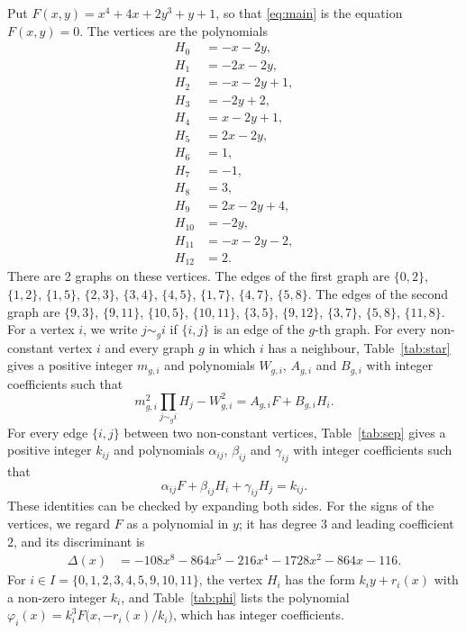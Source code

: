 \documentclass[11pt]{article}
\begin{document}
Put $F(x,y)=x^{4}+4x+2y^{3}+y+1$, so that \eqref{eq:main} is the equation $F(x,y)=0$. The vertices are the polynomials
\begin{align*}
H_{0}&=-x-2y,\\
H_{1}&=-2x-2y,\\
H_{2}&=-x-2y+1,\\
H_{3}&=-2y+2,\\
H_{4}&=x-2y+1,\\
H_{5}&=2x-2y,\\
H_{6}&=1,\\
H_{7}&=-1,\\
H_{8}&=3,\\
H_{9}&=2x-2y+4,\\
H_{10}&=-2y,\\
H_{11}&=-x-2y-2,\\
H_{12}&=2.
\end{align*}
There are 2 graphs on these vertices. The edges of the first graph are $\{0,2\}$, $\{1,2\}$, $\{1,5\}$, $\{2,3\}$, $\{3,4\}$, $\{4,5\}$, $\{1,7\}$, $\{4,7\}$, $\{5,8\}$. The edges of the second graph are $\{9,3\}$, $\{9,11\}$, $\{10,5\}$, $\{10,11\}$, $\{3,5\}$, $\{9,12\}$, $\{3,7\}$, $\{5,8\}$, $\{11,8\}$. For a vertex $i$, we write $j\sim_g i$ if $\{i,j\}$ is an edge of the $g$-th graph.
For every non-constant vertex $i$ and every graph $g$ in which $i$ has a neighbour, Table~\ref{tab:star} gives a positive integer $m_{g,i}$ and polynomials $W_{g,i}$, $A_{g,i}$ and $B_{g,i}$ with integer coefficients such that
\begin{equation}\label{eq:star}
m_{g,i}^2\prod_{j\sim_g i}H_j-W_{g,i}^2=A_{g,i}F+B_{g,i}H_i.
\end{equation}
For every edge $\{i,j\}$ between two non-constant vertices, Table~\ref{tab:sep} gives a positive integer $k_{ij}$ and polynomials $\alpha_{ij}$, $\beta_{ij}$ and $\gamma_{ij}$ with integer coefficients such that
\begin{equation}\label{eq:sep}
\alpha_{ij}F+\beta_{ij}H_i+\gamma_{ij}H_j=k_{ij}.
\end{equation}
These identities can be checked by expanding both sides.
For the signs of the vertices, we regard $F$ as a polynomial in $y$; it has degree $3$ and leading coefficient $2$, and its discriminant is
\begin{align*}
\Delta(x)&=-108x^{8}-864x^{5}-216x^{4}-1728x^{2}-864x-116.
\end{align*}
For $i\in I=\{0,\allowbreak 1,\allowbreak 2,\allowbreak 3,\allowbreak 4,\allowbreak 5,\allowbreak 9,\allowbreak 10,\allowbreak 11\}$, the vertex $H_i$ has the form $k_iy+r_i(x)$ with a non-zero integer $k_i$, and Table~\ref{tab:phi} lists the polynomial $\varphi_i(x)=k_i^3F\bigl(x,-r_i(x)/k_i\bigr)$, which has integer coefficients.
\end{document}
